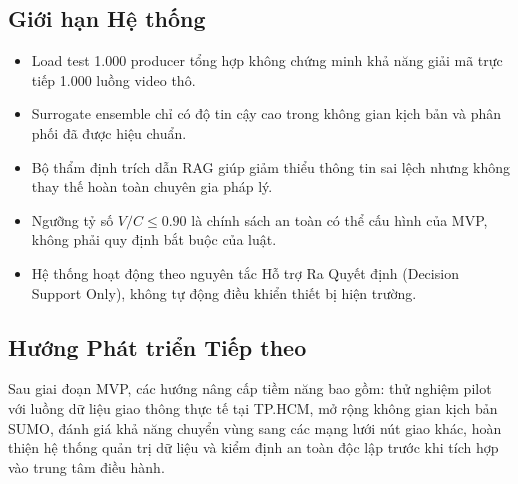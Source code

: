 \subsection{Giới hạn Hệ thống}
\begin{itemize}[leftmargin=1.5cm, label=--]
  \item Load test 1.000 producer tổng hợp không chứng minh khả năng giải mã trực tiếp 1.000 luồng video thô.
  \item Surrogate ensemble chỉ có độ tin cậy cao trong không gian kịch bản và phân phối đã được hiệu chuẩn.
  \item Bộ thẩm định trích dẫn RAG giúp giảm thiểu thông tin sai lệch nhưng không thay thế hoàn toàn chuyên gia pháp lý.
  \item Ngưỡng tỷ số $V/C \le 0.90$ là chính sách an toàn có thể cấu hình của MVP, không phải quy định bắt buộc của luật.
  \item Hệ thống hoạt động theo nguyên tắc Hỗ trợ Ra Quyết định (Decision Support Only), không tự động điều khiển thiết bị hiện trường.
\end{itemize}

\subsection{Hướng Phát triển Tiếp theo}
Sau giai đoạn MVP, các hướng nâng cấp tiềm năng bao gồm: thử nghiệm pilot với luồng dữ liệu giao thông thực tế tại TP.HCM, mở rộng không gian kịch bản SUMO, đánh giá khả năng chuyển vùng sang các mạng lưới nút giao khác, hoàn thiện hệ thống quản trị dữ liệu và kiểm định an toàn độc lập trước khi tích hợp vào trung tâm điều hành.
